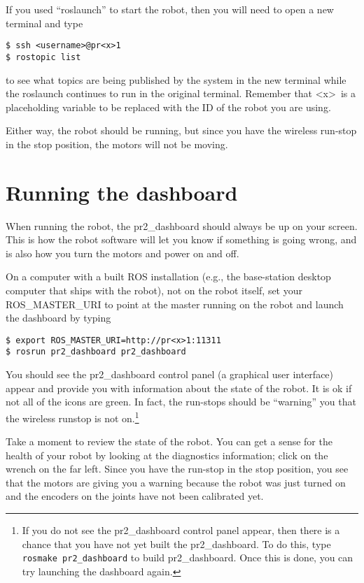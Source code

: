 If you used ``roslaunch'' to start the robot, then you will need to open a new terminal and type
\begin{verbatim}
$ ssh <username>@pr<x>1
$ rostopic list
\end{verbatim}
to see what topics are being published by the system in the new terminal while the roslaunch continues to run in the 
original terminal. Remember that \textless x\textgreater\ is a placeholding variable to be replaced with the ID of the robot you are using.

Either way, the robot should be running, but since you have the wireless run-stop in the stop position, the motors will not be moving.  

\section{Running the dashboard}
When running the robot, the pr2\_dashboard should always be up on your screen.  This is how the robot software will 
let you know if something is going wrong, and is also how you turn the motors and power on and off.  

On a computer with a built ROS installation (e.g., the base-station desktop computer that ships with the robot), not on the robot itself, set your ROS\_MASTER\_URI to point at the master running on the robot and launch the dashboard by typing
\begin{verbatim}
$ export ROS_MASTER_URI=http://pr<x>1:11311
$ rosrun pr2_dashboard pr2_dashboard
\end{verbatim}
You should see the pr2\_dashboard control panel (a graphical user interface) appear and provide you with information about the state of the robot. It is ok if not all of the icons are green. In fact, the run-stops should be ``warning'' you that the wireless runstop is not on.\footnote{If you do not see the pr2\_dashboard control panel appear, then there is a chance that you have not yet built the pr2\_dashboard. 
To do this, type \texttt{rosmake pr2\_dashboard} to build pr2\_dashboard. Once this is done, you can try launching the dashboard again.}

Take a moment to review the state of the robot. You can get a sense for the health of 
your robot by looking at the diagnostics information; click on the wrench on the far left.  Since you have the run-stop in the
stop position, you see that the motors are giving you a warning because the robot was just turned on and the encoders on the joints have not 
been calibrated yet. 

